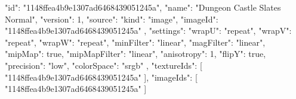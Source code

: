 {
  "id": "1148ffea4b9e1307ad6468439051245a",
  "name": "Dungeon Castle Slates Normal",
  "version": 1,
  "source": {
    "kind": "image",
    "imageId": "1148ffea4b9e1307ad6468439051245a"
  },
  "settings": {
    "wrapU": "repeat",
    "wrapV": "repeat",
    "wrapW": "repeat",
    "minFilter": "linear",
    "magFilter": "linear",
    "mipMap": true,
    "mipMapFilter": "linear",
    "anisotropy": 1,
    "flipY": true,
    "precision": "low",
    "colorSpace": "srgb"
  },
  "textureIds": [
    "1148ffea4b9e1307ad6468439051245a"
  ],
  "imageIds": [
    "1148ffea4b9e1307ad6468439051245a"
  ]
}
